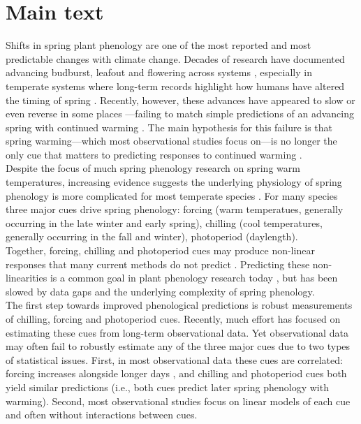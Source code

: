 \documentclass[11pt,letter]{article}
\begin{document}
\section{Main text}
Shifts in spring plant phenology are one of the most reported and most predictable changes with climate change. Decades of research have documented advancing budburst, leafout and flowering across systems \citep{delpierre2009, yu2010,Ellwood2012,jochner2013,hereford2017}, especially in temperate systems where long-term records highlight how humans have altered the timing of spring \citep{Schwartz:1997nn,Menzel2003a,menzel2006}. Recently, however, these advances have appeared to slow \citep{fu2015} or even reverse in some places \citep{yu2010}---failing to match simple predictions of an advancing spring with continued warming \citep{Ellwood2012}. The main hypothesis for this failure is that spring warming---which most observational studies focus on---is no longer the only cue that matters to predicting responses to continued warming \citep{chuine2016,gauzere2019}.\\

Despite the focus of much spring phenology research on spring warm temperatures, increasing evidence suggests the underlying physiology of spring phenology is more complicated for most temperate species \citep[e.g.,][]{zohner2016,gauzere2019,ettinger2020}. For many species three major cues drive spring phenology: forcing (warm temperatues, generally occurring in the late winter and early spring), chilling (cool temperatures, generally occurring in the fall and winter), photoperiod (daylength). \\

Together, forcing, chilling and photoperiod cues may produce non-linear responses that many current methods do not predict \citep[e.g.,][]{Ellwood2012}. Predicting these non-linearities is a common goal in plant phenology research today \citep{gusewell2017, martlusch2017,gauzere2019,chen2019,keenan2019}, but has been slowed by data gaps and the underlying complexity of spring phenology. \\

The first step towards improved phenological predictions is robust measurements of chilling, forcing and photoperiod cues. Recently, much effort has focused on estimating these cues from long-term observational data. Yet observational data may often fail to robustly estimate any of the three major cues due to two types of statistical issues. First, in most observational data these cues are correlated: forcing increases alongside longer days \citep{sarahailene2020}, and chilling and photoperiod cues both yield similar predictions (i.e., both cues predict later spring phenology with warming). Second, most observational studies focus on linear models of each cue and often without interactions between cues. \\
\end{document}
